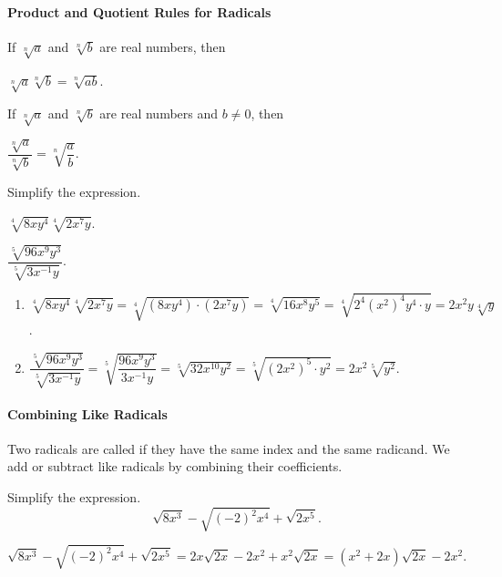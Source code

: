 \paragraph*{Product and Quotient Rules for Radicals}
	If $\sqrt[n]{a}$ and $\sqrt[n]{b}$ are real numbers, then\\
	\centerline{${\sqrt[n]a}{\sqrt[n]b}=\sqrt[n]{ab}$.}

	If $\sqrt[n]a$ and $\sqrt[n]b$ are real numbers and $b\neq 0$, then\\
	\centerline{$\dfrac{\sqrt[n]a}{\sqrt[n]b}=\sqrt[n]{\dfrac ab}.$}

	\begin{example}
		Simplify the expression.\\
		\begin{enumerate*}[label={(\arabic*)~}]
			\item $\sqrt[4]{8xy^4}\sqrt[4]{2x^7y}$.
			\item $\dfrac{\sqrt[5]{96x^9y^3}}{\sqrt[5]{3x^{-1}y}}$.\hfill\null
		\end{enumerate*}
	\end{example}
	\begin{solution}\mbox{}
		\begin{enumerate}[label={\emph{(\arabic*)}~}]
			\item $\sqrt[4]{8xy^4}\sqrt[4]{2x^7y}=\sqrt[4]{(8xy^4)\cdot (2x^7y)}=\sqrt[4]{16x^8y^5}=\sqrt[4]{2^4(x^2)^4y^4\cdot y}=2x^2y\sqrt[4]{y}$.
			\item $\dfrac{ \sqrt[5]{96x^9y^3} }{ \sqrt[5]{3x^{-1}y} }=\sqrt[5]{\dfrac{96x^9y^3}{3x^{-1}y}}=\sqrt[5]{32x^{10}y^2}=\sqrt[5]{(2x^2)^5\cdot y^2}=2x^2\sqrt[5]{y^2}$.
		\end{enumerate}
	\end{solution}


\paragraph*{Combining Like Radicals}
	Two radicals are called {} if they have the same index and the same radicand.  We add or subtract like radicals by combining their coefficients.

	\begin{example}
		Simplify the expression.
		\[
			\sqrt{8x^3}-\sqrt{(-2)^2 x^4}+\sqrt{2x^5}.
		\]
	\end{example}
	\begin{solution}
		\[
			\sqrt{8x^3}-\sqrt{(-2)^2 x^4}+\sqrt{2x^5}=2x\sqrt{2x}-2x^2+x^2\sqrt{2x}=(x^2+2x)\sqrt{2x}-2x^2.
		\]
	\end{solution}




